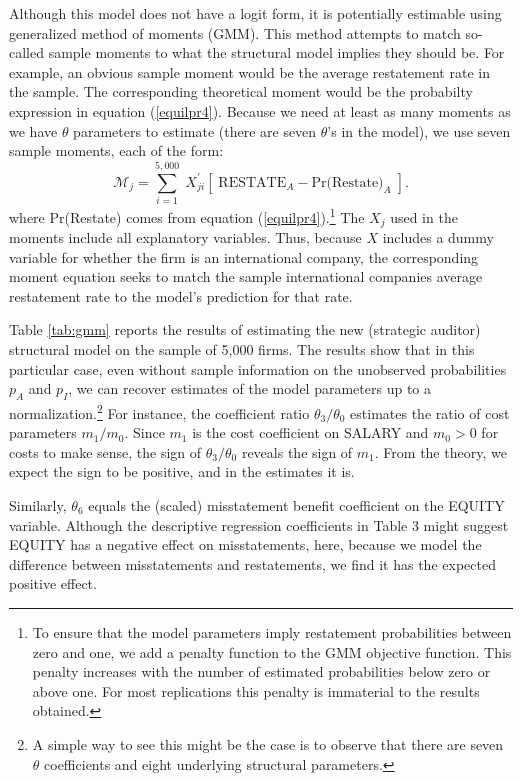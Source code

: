 Although this model does not have a logit form, it is potentially estimable using 
generalized method of moments (GMM).
This method attempts to match so-called sample moments to what the structural model implies they should be. 
For example, an obvious sample moment would be the average restatement rate in the sample.
The corresponding theoretical moment would be the probabilty expression in equation (\ref{equilpr4}).
Because we need at least as many moments as we have $\theta$ parameters to estimate (there are seven $\theta$'s in the model), we use seven sample moments, each of the form:
$$ \mathcal{M}_j = \sum_{i=1}^{5,000} \; X_{ji}^\prime\left[\; \mbox{RESTATE}_A - \mbox{Pr(Restate)}_A \; \right]. $$
where Pr(Restate) comes from equation (\ref{equilpr4}).\footnote{
To ensure that the model parameters imply restatement probabilities between zero and one, we add a penalty function to the GMM objective function.
This penalty increases with the number of estimated probabilities below zero or above one.
For most replications this penalty is immaterial to the results obtained.} 
The $X_j$ used in the moments include all explanatory variables. 
Thus, because $X$ includes  a dummy variable for whether the firm is an international company, the corresponding moment equation seeks to match the sample international companies average restatement rate to the model's prediction for that rate.

Table \ref{tab:gmm} reports the results of estimating the new (strategic auditor) structural model on the sample of 5,000 firms. 
The results show that in this particular case, even without sample information on the unobserved probabilities $p_A$ and $p_I$, we can recover estimates of the model parameters up to a normalization.\footnote{
A simple way to see this might be the case is to observe that there are seven $\theta$ coefficients and eight underlying structural parameters.}
For instance, the coefficient ratio $\theta_3/\theta_0$ estimates the ratio of cost parameters $m_1/m_0$.
Since $m_1$ is the cost coefficient on SALARY and $m_0>0$ for costs to make sense, the sign of $\theta_3/\theta_0$ reveals the sign of $m_1$.
From the theory, we expect the sign to be positive, and in the estimates it is. 

Similarly, $\theta_6$ equals the (scaled) misstatement benefit coefficient on the EQUITY variable.
Although the descriptive regression coefficients in Table 3 might suggest EQUITY has a negative effect on misstatements, here, because we model the difference between misstatements and restatements, we find it has the expected positive effect.

